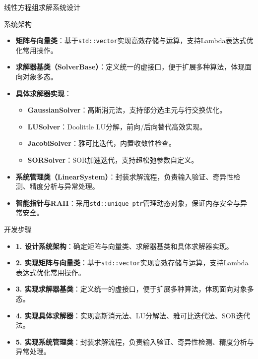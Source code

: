 \documentclass[UTF8,aspectratio=169]{beamer}
\begin{document}
\begin{frame}{线性方程组求解系统设计}
    \begin{ytublock}{系统架构}
        \begin{itemize}
            \item \textbf{矩阵与向量类}：基于\texttt{std::vector}实现高效存储与运算，支持Lambda表达式优化常用操作。
            \item \textbf{求解器基类（SolverBase）}：定义统一的虚接口，便于扩展多种算法，体现面向对象多态。
            \item \textbf{具体求解器实现}：
            \begin{itemize}
                \item \textbf{GaussianSolver}：高斯消元法，支持部分选主元与行交换优化。
                \item \textbf{LUSolver}：Doolittle LU分解，前向/后向替代高效实现。
                \item \textbf{JacobiSolver}：雅可比迭代，内置收敛性检查。
                \item \textbf{SORSolver}：SOR加速迭代，支持超松弛参数自定义。
            \end{itemize}
            \item \textbf{系统管理类（LinearSystem）}：封装求解流程，负责输入验证、奇异性检测、精度分析与异常处理。
            \item \textbf{智能指针与RAII}：采用\texttt{std::unique\_ptr}管理动态对象，保证内存安全与异常安全。
        \end{itemize}
    \end{ytublock}
\end{frame}

\begin{frame}{开发步骤}
    \begin{itemize}
        \item \textbf{1. 设计系统架构}：确定矩阵与向量类、求解器基类和具体求解器实现。
        \item \textbf{2. 实现矩阵与向量类}：基于\texttt{std::vector}实现高效存储与运算，支持Lambda表达式优化常用操作。
        \item \textbf{3. 实现求解器基类}：定义统一的虚接口，便于扩展多种算法，体现面向对象多态。
        \item \textbf{4. 实现具体求解器}：实现高斯消元法、LU分解法、雅可比迭代法、SOR迭代法。
        \item \textbf{5. 实现系统管理类}：封装求解流程，负责输入验证、奇异性检测、精度分析与异常处理。
    \end{itemize}
\end{frame}
\end{document}
